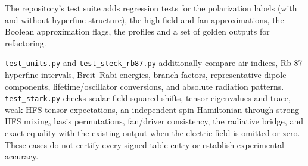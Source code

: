 \documentclass[11pt,a4paper]{article}
\newcommand{\code}[1]{\texttt{#1}}
\numberwithin{equation}{section}
\begin{document}
The repository's test suite adds regression tests for the polarization labels (with and without hyperfine structure), the high-field and fan approximations, the Boolean approximation flags, the profiles and a set of golden outputs for refactoring.

\code{test\_units.py} and \code{test\_steck\_rb87.py} additionally compare air indices, Rb-87 hyperfine intervals, Breit--Rabi energies, branch factors, representative dipole components, lifetime/oscillator conversions, and absolute radiation patterns. \code{test\_stark.py} checks scalar field-squared shifts, tensor eigenvalues and trace, weak-HFS tensor expectations, an independent spin Hamiltonian through strong HFS mixing, basis permutations, fan/driver consistency, the radiative bridge, and exact equality with the existing output when the electric field is omitted or zero. These cases do not certify every signed table entry or establish experimental accuracy.
\end{document}
